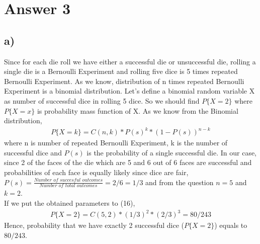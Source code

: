 \documentclass[12pt]{article}
\begin{document}
\section*{Answer 3}
\subsection*{a)} Since for each die roll we have either a successful die or unsuccessful die, rolling a single die is a Bernoulli Experiment and rolling five dice is 5 times repeated Bernoulli Experiment. As we know, distribution of n times repeated Bernoulli Experiment is a binomial distribution. Let's define a binomial random variable X as number of successful dice in rolling 5 dice. So we should find $P\{X = 2\}$ where $P\{X = x\}$ is probability mass function of X. As we know from the Binomial distribution, \\
\begin{equation} 
\begin{split}
P\{X = k\} = C(n,k)*P(s)^{k}*(1-P(s))^{n-k}
\end{split}
\end{equation}
where n is number of repeated Bernoulli Experiment, k is the number of successful dice and $P(s)$ is the probability of a single successful die. In our case, since 2 of the faces of the die which are 5 and 6 out of 6 faces are successful and probabilities of each face is equally likely since dice are fair, $P(s) = \frac{\textit{Number of succesful outcomes}}{\textit{Number of total outcomes}} =2/6 = 1/3$ and from the question $n=5$ and $k=2$.\\
If we put the obtained parameters to (16),\\
\begin{equation} 
\begin{split}
P\{X = 2\} = C(5,2)*(1/3)^{2}*(2/3)^{3} = 80/243
\end{split}
\end{equation}
Hence, probability that we have exactly 2 successful dice ($P\{X=2\}$) equals to $80/243$.
\end{document}
